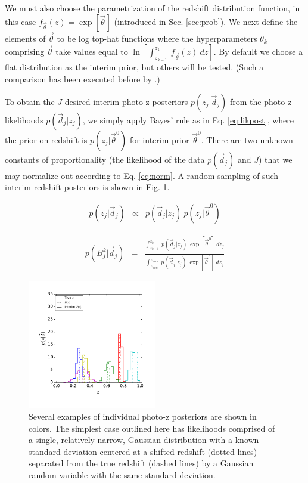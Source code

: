\documentclass[preprint]{aastex}
\begin{document}
We must also choose the parametrization of the redshift distribution function, 
in this case $f_{\vec{\theta}}(z)=\exp[\vec{\theta}]$ (introduced in Sec. 
\ref{sec:prob}).  We next define the elements of $\vec{\theta}$ to be log 
top-hat functions where the hyperparameters $\theta_{k}$ comprising 
$\vec{\theta}$ take values equal to $\ln[\int_{z_{k-1}}^{z_{k}}\ 
f_{\vec{\theta}}(z)\ dz]$.  By default we choose a flat distribution as the 
interim prior, but others will be tested.  (Such a comparison has been executed 
before by \citet{Viironen2015}.)

To obtain the $J$ desired interim photo-z posteriors $p(z_{j}|\vec{d}_{j})$ 
from the photo-z likelihoods $p(\vec{d}_{j}|z_{j})$, we simply apply Bayes' 
rule as in Eq. \ref{eq:likpost}, where the prior on redshift is 
$p(z_{j}|\vec{\theta}^{0})$ for interim prior $\vec{\theta}^{0}$.  There are 
two unknown constants of proportionality (the likelihood of the data 
$p(\vec{d}_{j})$ and $J$) that we may normalize out according to Eq. 
\ref{eq:norm}.  A random sampling of such interim redshift posteriors is shown 
in Fig. \ref{fig:nullpzs}.

\begin{eqnarray}
\label{eq:likpost}
p(z_{j}|\vec{d}_{j}) &\propto& p(\vec{d}_{j}|z_{j})\ p(z_{j}|\vec{\theta}^{0})
\end{eqnarray}

\begin{eqnarray}
\label{eq:norm}
p(B^{k}_{j}|\vec{d}_{j}) &=& \frac{\int_{z_{k-1}}^{z_{k}}\ 
p(\vec{d}_{j}|z_{j})\ \exp[\vec{\theta}^{0}]\ dz_{j}}{\int_{z_{min}}^{z_{max}}\ 
p(\vec{d}_{j}|z_{j})\ \exp[\vec{\theta}^{0}]\ dz_{j}}
\end{eqnarray}

\begin{figure}
\includegraphics[width=0.5\textwidth]{figs/null/samplepzs.pdf}
\caption{Several examples of individual photo-z posteriors are shown in colors. 
 The simplest case outlined here has likelihoods comprised of a single, 
relatively narrow, Gaussian distribution with a known standard deviation 
centered at a shifted redshift (dotted lines) separated from the true redshift 
(dashed lines) by a Gaussian random variable with the same standard deviation.}
\label{fig:nullpzs}
\end{figure}
\end{document}

